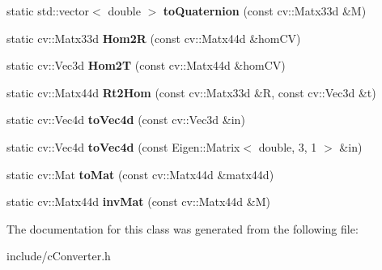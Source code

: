 \begin{DoxyCompactItemize}
\item 
static std\+::vector$<$ double $>$ {\bfseries to\+Quaternion} (const cv\+::\+Matx33d \&M)\hypertarget{classMultiColSLAM_1_1cConverter_a51b7cf50aa5b5852ffc88e45516a39db}{}\label{classMultiColSLAM_1_1cConverter_a51b7cf50aa5b5852ffc88e45516a39db}

\item 
static cv\+::\+Matx33d {\bfseries Hom2R} (const cv\+::\+Matx44d \&hom\+CV)\hypertarget{classMultiColSLAM_1_1cConverter_a269e0ca56c713de6efc272dec66ddb81}{}\label{classMultiColSLAM_1_1cConverter_a269e0ca56c713de6efc272dec66ddb81}

\item 
static cv\+::\+Vec3d {\bfseries Hom2T} (const cv\+::\+Matx44d \&hom\+CV)\hypertarget{classMultiColSLAM_1_1cConverter_ac49492df8b6e355512d56dbfbdfd7fe5}{}\label{classMultiColSLAM_1_1cConverter_ac49492df8b6e355512d56dbfbdfd7fe5}

\item 
static cv\+::\+Matx44d {\bfseries Rt2\+Hom} (const cv\+::\+Matx33d \&R, const cv\+::\+Vec3d \&t)\hypertarget{classMultiColSLAM_1_1cConverter_ab91651922aefa9d4a1e9483a2a3ec847}{}\label{classMultiColSLAM_1_1cConverter_ab91651922aefa9d4a1e9483a2a3ec847}

\item 
static cv\+::\+Vec4d {\bfseries to\+Vec4d} (const cv\+::\+Vec3d \&in)\hypertarget{classMultiColSLAM_1_1cConverter_ae4a4f2225f6f45e319224552691ef9b2}{}\label{classMultiColSLAM_1_1cConverter_ae4a4f2225f6f45e319224552691ef9b2}

\item 
static cv\+::\+Vec4d {\bfseries to\+Vec4d} (const Eigen\+::\+Matrix$<$ double, 3, 1 $>$ \&in)\hypertarget{classMultiColSLAM_1_1cConverter_a8d8d1671427c65c72f9a97260026aa6a}{}\label{classMultiColSLAM_1_1cConverter_a8d8d1671427c65c72f9a97260026aa6a}

\item 
static cv\+::\+Mat {\bfseries to\+Mat} (const cv\+::\+Matx44d \&matx44d)\hypertarget{classMultiColSLAM_1_1cConverter_a5fa2f3455615b98dc370ea6d56a869c3}{}\label{classMultiColSLAM_1_1cConverter_a5fa2f3455615b98dc370ea6d56a869c3}

\item 
static cv\+::\+Matx44d {\bfseries inv\+Mat} (const cv\+::\+Matx44d \&M)\hypertarget{classMultiColSLAM_1_1cConverter_a8fe4b4998e2b2141b00ab7163ed1adcb}{}\label{classMultiColSLAM_1_1cConverter_a8fe4b4998e2b2141b00ab7163ed1adcb}

\end{DoxyCompactItemize}


The documentation for this class was generated from the following file\+:\begin{DoxyCompactItemize}
\item 
include/c\+Converter.\+h\end{DoxyCompactItemize}
